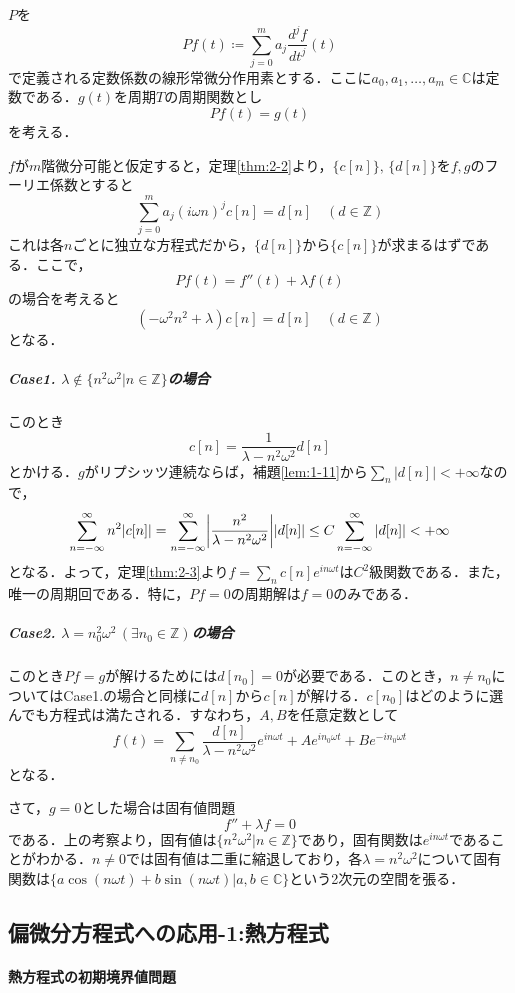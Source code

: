 \documentclass[dvipdfmx,a4j,10pt]{jsarticle}
\theoremstyle{mystyle1}
\theoremstyle{mystyle3}
\theoremstyle{mystyle4}
\theoremstyle{mystyle6}
\theoremstyle{mystyle2}
\theoremstyle{mystyle5}
\begin{document}
$P$を
\[
	Pf(t)\coloneqq\sum_{j=0}^m a_j\frac{d^j f}{dt^j}(t)
\]
で定義される定数係数の線形常微分作用素とする．ここに$a_0,a_1,\ldots,a_m\in\mathbb{C}$は定数である．$g(t)$を周期$T$の周期関数とし
\[
	Pf(t)=g(t)
\]
を考える．

$f$が$m$階微分可能と仮定すると，定理\ref{thm:2-2}より，$\{c[n]\},\,\{d[n]\}$を$f,g$のフーリエ係数とすると
\[
	\sum_{j=0}^m a_j(i\omega n)^j c[n]=d[n]\quad(d\in\mathbb{Z})
\]
これは各$n$ごとに独立な方程式だから，$\{d[n]\}$から$\{c[n]\}$が求まるはずである．ここで，
\[
	Pf(t)=f''(t)+\lambda f(t)
\]
の場合を考えると
\[
	(-\omega^2 n^2+\lambda)c[n]=d[n]\quad(d\in\mathbb{Z})
\]
となる．

\subparagraph{Case1. $\lambda\notin\{n^2\omega^2|n\in\mathbb{Z}\}$の場合}

このとき
\[
	c[n]=\frac{1}{\lambda-n^2\omega^2}d[n]
\]
とかける．$g$がリプシッツ連続ならば，補題\ref{lem:1-11}から$\sum_n |d[n]|<+\infty$なので，
\[
	\sum_{n=-\infty}^\infty n^2|c[n]|=\sum_{n=-\infty}^\infty\mleft|\frac{n^2}{\lambda-n^2\omega^2}\mright||d[n]|\leq C\sum_{n=-\infty}^\infty|d[n]|<+\infty
\]
となる．よって，定理\ref{thm:2-3}より$f=\sum_n c[n]e^{in\omega t}$は$C^2$級関数である．また，唯一の周期回である．特に，$Pf=0$の周期解は$f=0$のみである．

\subparagraph{Case2. $\lambda=n_0^2\omega^2\,(\exists n_0\in\mathbb{Z})$の場合}

このとき$Pf=g$が解けるためには$d[n_0]=0$が必要である．このとき，$n\neq n_0$についてはCase1.の場合と同様に$d[n]$から$c[n]$が解ける．$c[n_0]$はどのように選んでも方程式は満たされる．すなわち，$A,B$を任意定数として
\[
	f(t)=\sum_{n\neq n_0}\frac{d[n]}{\lambda-n^2\omega^2}e^{in\omega t}+Ae^{in_0\omega t}+Be^{-in_0\omega t}
\]
となる．

さて，$g=0$とした場合は固有値問題
\[
	f''+\lambda f=0
\]
である．上の考察より，固有値は$\{n^2\omega^2 | n\in\mathbb{Z}\}$であり，固有関数は$e^{in\omega t}$であることがわかる．$n\neq 0$では固有値は二重に縮退しており，各$\lambda=n^2\omega^2$について固有関数は$\{a\cos(n\omega t)+b\sin(n\omega t)|a,b\in\mathbb{C}\}$という2次元の空間を張る．


\subsection{偏微分方程式への応用-1:熱方程式}

\paragraph{熱方程式の初期境界値問題}
\end{document}
